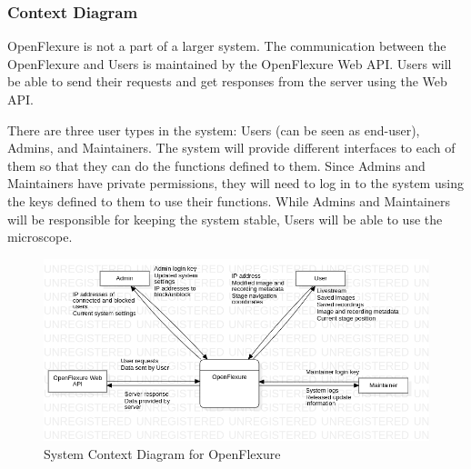 \subsubsection{Context Diagram}
OpenFlexure is not a part of a larger system. The communication between the OpenFlexure and Users is maintained by the OpenFlexure Web API. Users will be able to send their requests and get responses from the server using the Web API.

There are three user types in the system: Users (can be seen as end-user), Admins, and Maintainers. The system will provide different interfaces to each of them so that they can do the functions defined to them. Since Admins and Maintainers have private permissions, they will need to log in to the system using the keys defined to them to use their functions. While Admins and Maintainers will be responsible for keeping the system stable, Users will be able to use the microscope.

\begin{figure}[H]
	\centering
	\includegraphics[scale=0.5]{Uml_Images/system_context_diagram}
	\caption{System Context Diagram for OpenFlexure}
	\label{fig:system_context_diagram}
\end{figure}



